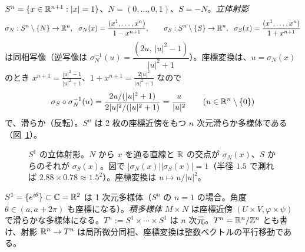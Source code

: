 \begin{ex}[球面 $S^n$、立体射影]\label{A:ex:Sn}
$S^n=\{x\in\mathbb R^{n+1}:|x|=1\}$、$N=(0,\dots,0,1)$、$S=-N$。\emph{立体射影}
\[
\sigma_N:S^n\setminus\{N\}\to\R^n,\ \ \sigma_N(x)=\frac{(x^1,\dots,x^n)}{1-x^{n+1}},\qquad
\sigma_S:S^n\setminus\{S\}\to\R^n,\ \ \sigma_S(x)=\frac{(x^1,\dots,x^n)}{1+x^{n+1}}
\]
は同相写像（逆写像は $\sigma_N^{-1}(u)=\dfrac{(2u,\ |u|^2-1)}{|u|^2+1}$）。座標変換は、$u=\sigma_N(x)$ のとき \mbox{$x^{n+1}=\frac{|u|^2-1}{|u|^2+1}$}、\allowbreak\mbox{$1+x^{n+1}=\frac{2|u|^2}{|u|^2+1}$} なので
\[
\sigma_S\circ\sigma_N^{-1}(u)=\frac{2u/(|u|^2+1)}{2|u|^2/(|u|^2+1)}=\frac{u}{|u|^2}\qquad(u\in\mathbb R^n\setminus\{0\})
\]
で、滑らか（反転）。$S^n$ は 2 枚の座標近傍をもつ $n$ 次元滑らか多様体である（図~\ref{A:fig:stereo}）。
\end{ex}

\begin{figure}[htbp]
\centering
{}
\caption{$S^1$ の立体射影。$N$ から $x$ を通る直線と $\mathbb R$ の交点が $\sigma_N(x)$、$S$ からのそれが $\sigma_S(x)$。図で $|\sigma_N(x)||\sigma_S(x)|=1$（半径 $1.5$ で測れば $2.88\times0.78\approx1.5^2$）。座標変換は $u\mapsto u/|u|^2$。}\label{A:fig:stereo}
\end{figure}

\begin{ex}[トーラス $T^n$]\label{A:ex:torus}
$S^1=\{e^{i\theta}\}\subset\mathbb C=\mathbb R^2$ は 1 次元多様体（$S^n$ の $n=1$ の場合。角度 $\theta\in(a,a+2\pi)$ も座標になる）。\emph{積多様体} $M\times N$ は座標近傍 $(U\times V,\varphi\times\psi)$ で滑らかな多様体になる。$T^n:=S^1\times\cdots\times S^1$ は $n$ 次元。$T^n=\mathbb R^n/\mathbb Z^n$ とも書け、射影 $\mathbb R^n\to T^n$ は局所微分同相、座標変換は整数ベクトルの平行移動である。
\end{ex}

